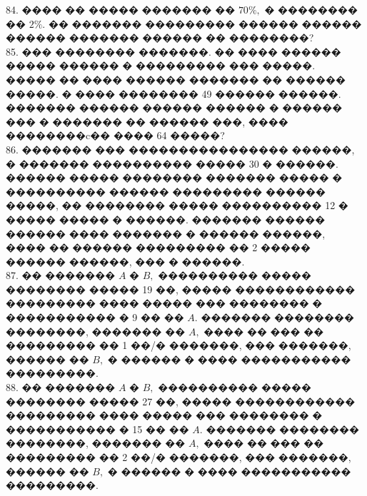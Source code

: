 \documentclass[12pt]{article}
\begin{document}
84. ���� �� ����� ������� �� $70\%,$ � �������� �� $2\%.$ �� ������� ��������� ������ ������ ������ ������� ������ �� ��������?\\
85. ��� �������� �������. �� ���� ������ ����� ������ �
��������� ��� �����. ����� �� ���� ������ ������� ��
������ �����. � ���� �������� 49 ������ ������. �������
������ ������ ������ � ������ ��� � ������� �� ������
���, ���� ��������c�� ���� 64 �����?\\
86. ������� ��� ���������������� ������, � �������
���������� ����� 30 � ������. ������ ����� ��������
������� ����� � ���������� ������ ��������� ������
�����, �� �������� ����� ���������� 12 � ����� ����� �
������. ������� ������ ������ ���� ������� � ������
������, ���� �� ������ ��������� �� 2 ����� ������
������, ��� � ������.\\
87. �� ������� $A$ � $B,$ ���������� ����� �������� ����� 19
��, ����� ������������ ��������� ���� ����� ���
�������� � ����������� � 9 �� �� $A.$ ������� ��������
��������, ������� �� $A,$ ���� �� ��� �� ��������� ��
1 ��/� �������, ��� �������, ������ �� $B,$ � ������ �
���� ����������� ���������.\\
88. �� ������� $A$ � $B,$ ���������� ����� �������� ����� 27
��, ����� ������������ ��������� ���� ����� ���
�������� � ����������� � 15 �� �� $A.$ ������� ��������
��������, ������� �� $A,$ ���� �� ��� �� ��������� ��
2 ��/� �������, ��� �������, ������ �� $B,$ � ������ �
���� ����������� ���������.
\newpage
\end{document}
